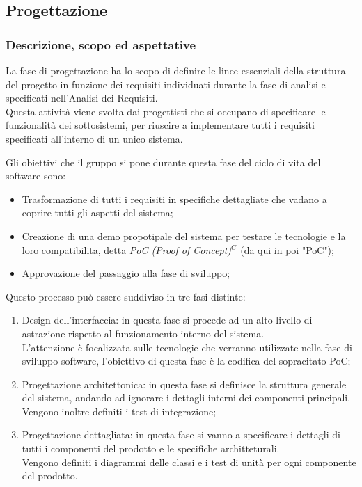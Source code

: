 \subsection{Progettazione}

\subsubsection{Descrizione, scopo ed aspettative}
La fase di progettazione ha lo scopo di definire le linee essenziali della struttura del progetto in funzione dei requisiti individuati durante la fase di analisi e specificati nell’Analisi dei Requisiti. \\
Questa attività viene svolta dai progettisti che si occupano di specificare le funzionalità dei sottosistemi, per riuscire a implementare tutti i requisiti specificati all'interno di un unico sistema.

Gli obiettivi che il gruppo si pone durante questa fase del ciclo di vita del software sono:
\begin{itemize}
    \item Trasformazione di tutti i requisiti in specifiche dettagliate che vadano a coprire tutti gli aspetti del sistema;
    \item Creazione di una demo propotipale del sistema per testare le tecnologie e la loro compatibilita, detta \emph{PoC (Proof of Concept)}$^{G}$ (da qui in poi "PoC");
    \item Approvazione del passaggio alla fase di sviluppo;
\end{itemize}

Questo processo può essere suddiviso in tre fasi distinte:
\begin{enumerate}
    \item Design dell'interfaccia: in questa fase si procede ad un alto livello di astrazione rispetto al funzionamento interno del sistema.\\
          L'attenzione è focalizzata sulle tecnologie che verranno utilizzate nella fase di sviluppo software, l'obiettivo di questa fase è la codifica del sopracitato PoC; 
    \item Progettazione architettonica: in questa fase si definisce la struttura generale del sistema, andando ad ignorare i dettagli interni dei componenti principali. \\
          Vengono inoltre definiti i test di integrazione;
    \item Progettazione dettagliata: in questa fase si vanno a specificare i dettagli di tutti i componenti del prodotto e le specifiche architteturali. \\
          Vengono definiti i diagrammi delle classi e i test di unità per ogni componente del prodotto.
\end{enumerate}
